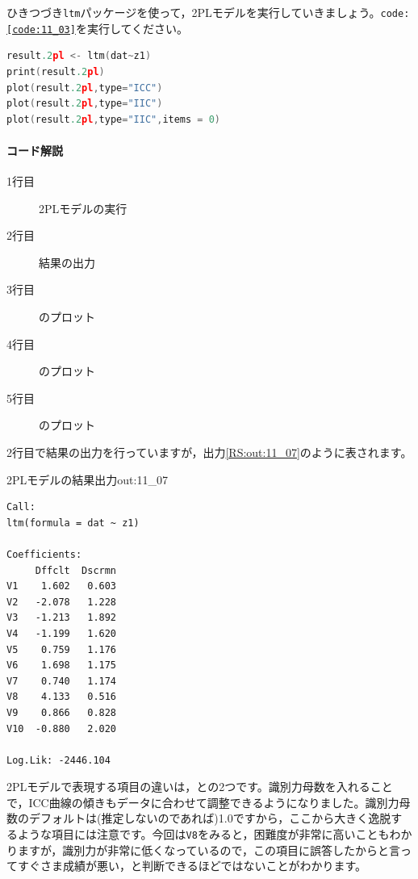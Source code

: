 \documentclass{ltjsbook}
\begin{document}
ひきつづき\texttt{ltm}パッケージを使って，2PLモデルを実行していきましょう。\texttt{code:\ref{code:11_03}}を実行してください。

\begin{lstlisting}[language=c++,label={code:11_03},caption={2PLモデルの実行}]
result.2pl <- ltm(dat~z1)
print(result.2pl)
plot(result.2pl,type="ICC")
plot(result.2pl,type="IIC")
plot(result.2pl,type="IIC",items = 0)
\end{lstlisting}

\paragraph{コード解説}
\begin{description}
	\item[1行目] 2PLモデルの実行
	\item[2行目] 結果の出力
	\item[3行目] のプロット
	\item[4行目] のプロット
	\item[5行目] のプロット
\end{description}

2行目で結果の出力を行っていますが，出力\ref{RS:out:11_07}のように表されます。
\begin{Rscreen}{2PLモデルの結果出力}{out:11_07}
	\begin{verbatim}
Call:
ltm(formula = dat ~ z1)

Coefficients:
     Dffclt  Dscrmn
V1    1.602   0.603
V2   -2.078   1.228
V3   -1.213   1.892
V4   -1.199   1.620
V5    0.759   1.176
V6    1.698   1.175
V7    0.740   1.174
V8    4.133   0.516
V9    0.866   0.828
V10  -0.880   2.020

Log.Lik: -2446.104
    \end{verbatim}
\end{Rscreen}

2PLモデルで表現する項目の違いは，との2つです。識別力母数を入れることで，ICC曲線の傾きもデータに合わせて調整できるようになりました。識別力母数のデフォルトは(推定しないのであれば)1.0ですから，ここから大きく逸脱するような項目には注意です。今回は\texttt{V8}をみると，困難度が非常に高いこともわかりますが，識別力が非常に低くなっているので，この項目に誤答したからと言ってすぐさま成績が悪い，と判断できるほどではないことがわかります。
\end{document}
